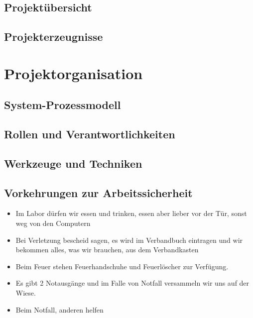 \textbf{
  }

\section{Projektübersicht}
\label{spmp:projektuebersicht}


\section{Projekterzeugnisse}
\label{spmp:projekterzeugnisse}


\chapter{Projektorganisation}
\label{spmp:projektorganisation}

\section{System-Prozessmodell}
\label{spmp:system-prozessmodell}


\section{Rollen und Verantwortlichkeiten}
\label{spmp:rollen-verantwortlichkeiten}

\section{Werkzeuge und Techniken}
\label{spmp:werkzeuge-techniken}

\section{Vorkehrungen zur Arbeitssicherheit}
 
\begin{itemize}
  \item Im Labor dürfen wir essen und trinken, essen aber lieber vor der Tür, 
    sonst weg von den Computern
  \item Bei Verletzung bescheid sagen, es wird im Verbandbuch eintragen und wir 
    bekommen alles, was wir brauchen, aus dem Verbandkasten
  \item Beim Feuer stehen Feuerhandschuhe und Feuerlöscher zur Verfügung.
  \item Es gibt 2 Notausgänge und im Falle von Notfall versammeln wir uns auf der Wiese.
  \item Beim Notfall, anderen helfen
    \end{itemize}


